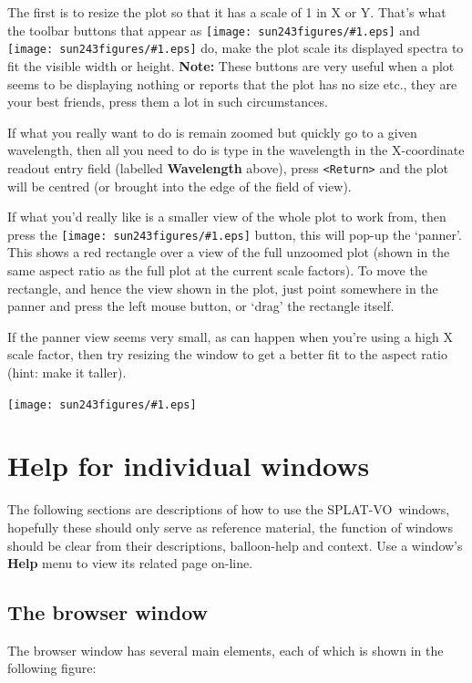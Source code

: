 \documentclass[twoside,11pt]{article}
\newcommand{\htmladdimg}[1]{}
\newcommand{\latexhtml}[2]{#1}
\newcommand{\xlabel}[1]{}
\renewcommand{\_}{\texttt{\symbol{95}}}
\newcommand{\SPLAT}{\textsf{SPLAT-VO}}
\newcommand{\mainfigure}[1]
{\begin{center}
 \latexhtml{\texttt{[image: sun243\_figures/\#1.eps]}}{\htmladdimg{#1.gif}}
 \end{center}
}
\newcommand{\inline}[1]
        {\latexhtml{\texttt{[image: sun243\_figures/\#1.eps]}}
        {\htmladdimg[align=center]{#1.gif}}}
\newcommand{\menuitem}[1]{\textbf{#1}}
\newcommand{\labelitem}[1]{\textbf{#1}}
\newcommand{\hitext}[1]{\texttt{#1}}
\begin{document}
The first is to resize the plot so that it has a scale of 1 in X or
Y. That's what the toolbar buttons that appear as
\inline{fitwidth} and \inline{fitheight} do, make the plot scale its
displayed spectra to fit the visible width or height.
\textbf{Note:} These buttons are very useful when a plot seems to be
displaying nothing or reports that the plot has no size etc., they are your
best friends, press them a lot in such circumstances.

If what you really want to do is remain zoomed but quickly go to a
given wavelength, then all you need to do is type in the wavelength in
the X-coordinate readout entry field (labelled \labelitem{Wavelength}
above), press \hitext{<Return>} and the plot will be centred (or
brought into the edge of the field of view).

If what you'd really like is a smaller view of the whole plot to work
from, then press the \inline{panner} button, this will pop-up the
`panner'. This shows a red rectangle over a view of the full unzoomed
plot (shown in the same aspect ratio as the full plot at the current
scale factors). To move the rectangle, and hence the view shown in the
plot, just point somewhere in the panner and press the left mouse
button, or `drag' the rectangle itself.

If the panner view seems very small, as can happen when you're using a
high X scale factor, then try resizing the window to get a better fit
to the aspect ratio (hint: make it taller).

\mainfigure{pannerwindow}

\section{Help for individual windows\xlabel{help_window_individual}}

The following sections are descriptions of how to use the
\SPLAT\ windows, hopefully these should only serve as reference
material, the function of windows should be clear from their
descriptions, balloon-help and context. Use a window's \menuitem{Help}
menu to view its related page on-line.

\newpage
\subsection{The browser window\xlabel{browser_window}}

The browser window has several main elements, each of which is shown
in the following figure:
\end{document}
